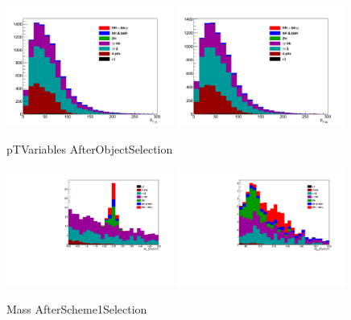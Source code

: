 \documentclass{cmspaper}
\begin{document}
 \begin{figure}[h]
   \centering
  \includegraphics[width=0.49\textwidth]{figures/diphotonPt.pdf} 
  \includegraphics[width=0.49\textwidth]{figures/dibjetPt.pdf}
   \caption{pTVariables AfterObjectSelection}
   \label{fig:pTVariables_AfterObjectSelection}
 \end{figure}

 \begin{figure}[h]
   \centering
   \includegraphics[width=0.49\textwidth]{figures/MassGGAfterScheme1Selection.pdf}
   \includegraphics[width=0.49\textwidth]{figures/MassBBAfterScheme1Selection.pdf}
   \caption{Mass AfterScheme1Selection}
   \label{fig:HiggsMass_AfterObjectSelection}
 \end{figure}
\end{document}
